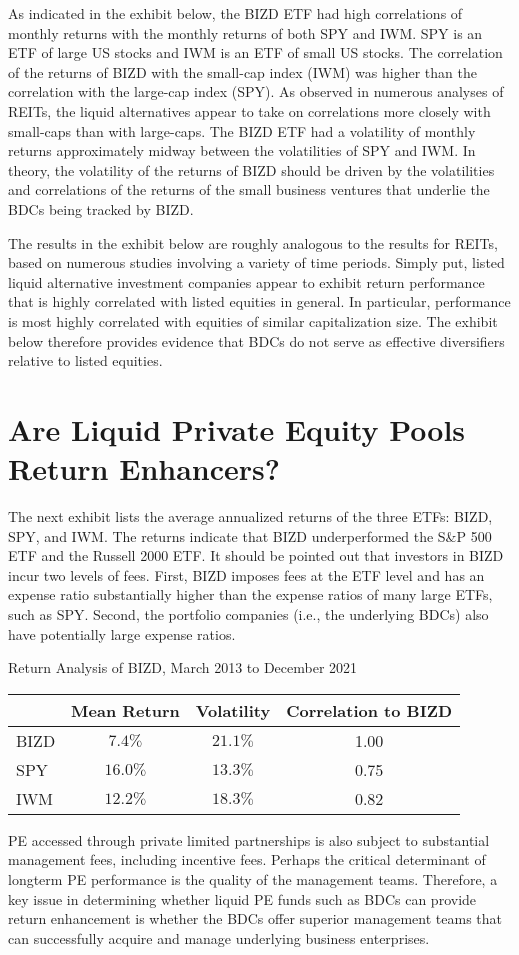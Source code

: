 \documentclass[11pt]{article}
\begin{document}
As indicated in the exhibit below, the BIZD ETF had high correlations of monthly returns with the monthly returns of both SPY and IWM. SPY is an ETF of large US stocks and IWM is an ETF of small US stocks. The correlation of the returns of BIZD with the small-cap index (IWM) was higher than the correlation with the large-cap index (SPY). As observed in numerous analyses of REITs, the liquid alternatives appear to take on correlations more closely with small-caps than with large-caps. The BIZD ETF had a volatility of monthly returns approximately midway between the volatilities of SPY and IWM. In theory, the volatility of the returns of BIZD should be driven by the volatilities and correlations of the returns of the small business ventures that underlie the BDCs being tracked by BIZD.

The results in the exhibit below are roughly analogous to the results for REITs, based on numerous studies involving a variety of time periods. Simply put, listed liquid alternative investment companies appear to exhibit return performance that is highly correlated with listed equities in general. In particular, performance is most highly correlated with equities of similar capitalization size. The exhibit below therefore provides evidence that BDCs do not serve as effective diversifiers relative to listed equities.

\section*{Are Liquid Private Equity Pools Return Enhancers?}
The next exhibit lists the average annualized returns of the three ETFs: BIZD, SPY, and IWM. The returns indicate that BIZD underperformed the S\&P 500 ETF and the Russell 2000 ETF. It should be pointed out that investors in BIZD incur two levels of fees. First, BIZD imposes fees at the ETF level and has an expense ratio substantially higher than the expense ratios of many large ETFs, such as SPY. Second, the portfolio companies (i.e., the underlying BDCs) also have potentially large expense ratios.

Return Analysis of BIZD, March 2013 to December 2021

\begin{center}
\begin{tabular}{|lccc|}
\hline
 & Mean Return & Volatility & Correlation to BIZD \\
\hline
BIZD & $7.4 \%$ & $21.1 \%$ & 1.00 \\
SPY & $16.0 \%$ & $13.3 \%$ & 0.75 \\
IWM & $12.2 \%$ & $18.3 \%$ & 0.82 \\
\hline
\end{tabular}
\end{center}

PE accessed through private limited partnerships is also subject to substantial management fees, including incentive fees. Perhaps the critical determinant of longterm PE performance is the quality of the management teams. Therefore, a key issue in determining whether liquid PE funds such as BDCs can provide return enhancement is whether the BDCs offer superior management teams that can successfully acquire and manage underlying business enterprises.
\end{document}
